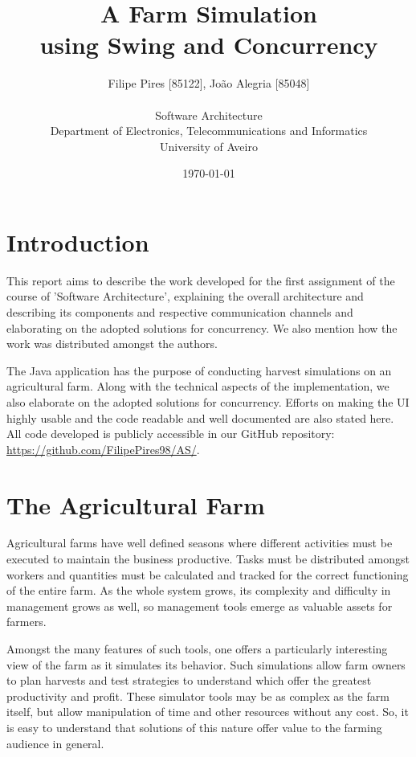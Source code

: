 \documentclass[12pt]{article}
\title{A Farm Simulation\\using Swing and Concurrency}
\author
{Filipe Pires [85122], João Alegria [85048]\\
\\
Software Architecture\\
\normalsize{Department of Electronics, Telecommunications and Informatics}\\
\normalsize{University of Aveiro}\\
}
\date{\today{}}
\begin{document}
 

\baselineskip18pt

\maketitle 

\section{Introduction} %

This report aims to describe the work developed for the first assignment of the course of 'Software Architecture', explaining the overall architecture and 
describing its components and respective communication channels and elaborating on the adopted solutions for concurrency.
We also mention how the work was distributed amongst the authors.

The Java application has the purpose of conducting harvest simulations on an agricultural farm.
Along with the technical aspects of the implementation, we also elaborate on the adopted solutions for concurrency.
Efforts on making the UI highly usable and the code readable and well documented are also stated here.
All code developed is publicly accessible in our GitHub repository:
\url{https://github.com/FilipePires98/AS/}.
\newpage

\section{The Agricultural Farm} \label{farm} %

Agricultural farms have well defined seasons where different activities must be executed to maintain the business productive.
Tasks must be distributed amongst workers and quantities must be calculated and tracked for the correct functioning of the entire farm.
As the whole system grows, its complexity and difficulty in management grows as well, so management tools emerge as valuable assets for farmers.

Amongst the many features of such tools, one offers a particularly interesting view of the farm as it simulates its behavior.
Such simulations allow farm owners to plan harvests and test strategies to understand which offer the greatest productivity and profit.
These simulator tools may be as complex as the farm itself, but allow manipulation of time and other resources without any cost.
So, it is easy to understand that solutions of this nature offer value to the farming audience in general.
\end{document}

